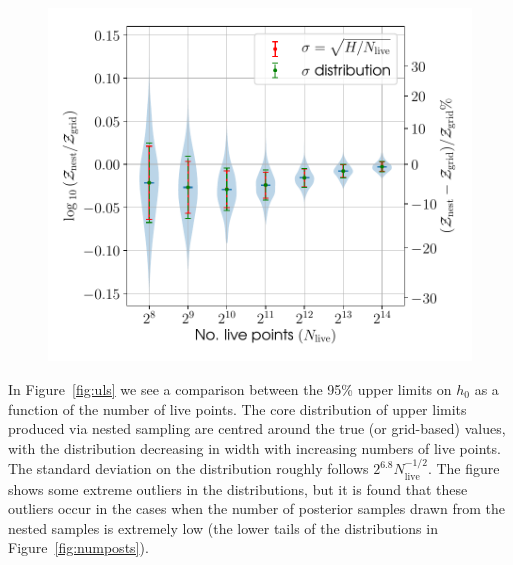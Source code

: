 \begin{figure}[!phtb]
\begin{center}
\includegraphics[width=1\columnwidth]{./figures/codeeval/stats/nest_evs/nest_evs}
\caption{ \protect}
\end{center}
\end{figure}

In Figure~\ref{fig:uls} we see a comparison between the 95\% upper limits on $h_0$ as a function of the number of live points. The core distribution of upper
limits produced via nested sampling are centred around the true (or grid-based) values, with the distribution decreasing in width with increasing numbers of live points.
The standard deviation on the distribution roughly follows $2^{6.8}N_{\text{live}}^{-1/2}$. The figure shows some extreme outliers in the distributions, but it
is found that these outliers occur in the cases when the number of posterior samples drawn from the nested samples is extremely low (the lower tails of the
distributions in Figure~\ref{fig:numposts}).

